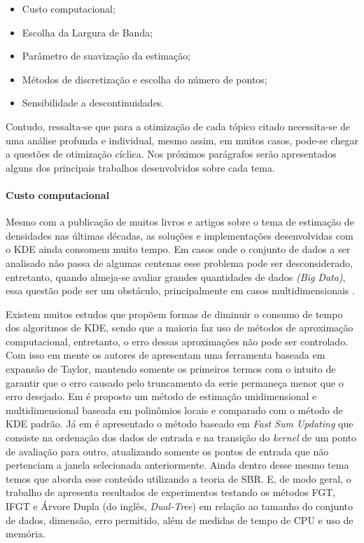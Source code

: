 \begin{itemize}
	\item Custo computacional;
	\item Escolha da Largura de Banda;
	\item Parâmetro de suavização da estimação;
	\item Métodos de discretização e escolha do número de pontos;
	\item Sensibilidade a descontinuidades. 
\end{itemize}

Contudo, ressalta-se que para a otimização de cada tópico citado necessita-se de uma análise profunda e individual, mesmo assim, em muitos casos, pode-se chegar a questões de otimização cíclica. Nos próximos parágrafos serão apresentados alguns dos principais trabalhos desenvolvidos sobre cada tema.


\paragraph{Custo computacional}

Mesmo com a publicação de muitos livros e artigos sobre o tema de estimação de densidades nas últimas décadas, as soluções e implementações desenvolvidas com o \ac{KDE} ainda consomem muito tempo. Em casos onde o conjunto de dados a ser analisado não passa de algumas centenas esse problema pode ser desconsiderado, entretanto, quando almeja-se avaliar grandes quantidades de dados \textit{(Big Data)}, essa questão pode ser um obstáculo, principalmente em casos multidimensionais \cite{gramacki2017nonparametric}.

Existem muitos estudos que propõem formas de diminuir o consumo de tempo dos algoritmos de \ac{KDE}, sendo que a maioria faz uso de métodos de aproximação computacional, entretanto, o erro dessas aproximações não pode ser controlado. Com isso em mente os autores de \cite{raykar2010fast} apresentam uma ferramenta baseada em expansão de Taylor, mantendo somente os primeiros termos com o intuito de garantir que o erro causado pelo truncamento da serie permaneça menor que o erro desejado. Em \cite{tang2016fast} é proposto um método de estimação unidimensional e multidimensional baseada em polinômios locais e comparado com o método de \ac{KDE} padrão. Já em \cite{langrene2017fast} é apresentado o método baseado em \textit{Fast Sum Updating} que consiste na ordenação dos dados de entrada e na transição do \textit{kernel} de um ponto de avaliação para outro, atualizando somente os pontos de entrada que não pertenciam a janela selecionada anteriormente. Ainda dentro desse mesmo tema temos \cite{yin2008fast} que aborda esse conteúdo utilizando a teoria de \ac{SBR}. E, de modo geral, o trabalho de \cite{lang2005empirical} apresenta resultados de experimentos testando os métodos \ac{FGT}, \ac{IFGT} e Árvore Dupla (do inglês, \textit{Dual-Tree}) em relação ao tamanho do conjunto de dados, dimensão, erro permitido, além de medidas de tempo de CPU e uso de memória.

